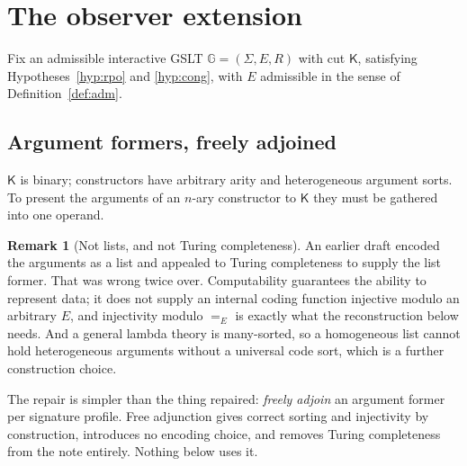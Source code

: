 \documentclass[11pt]{article}
\theoremstyle{plain}
\theoremstyle{definition}
\newtheorem{remark}[theorem]{Remark}
\newcommand{\Kc}{\mathsf{K}}
\newcommand{\Gg}{\mathbb{G}}
\begin{document}
\section{The observer extension}
\label{sec:construction}

Fix an admissible interactive GSLT $\Gg = (\Sigma,E,R)$ with cut $\Kc$, satisfying
Hypotheses~\ref{hyp:rpo} and \ref{hyp:cong}, with $E$ admissible in the sense of
Definition~\ref{def:adm}.

\subsection{Argument formers, freely adjoined}

$\Kc$ is binary; constructors have arbitrary arity and heterogeneous argument sorts. To present the
arguments of an $n$-ary constructor to $\Kc$ they must be gathered into one operand.

\begin{remark}[Not lists, and not Turing completeness]
\label{rem:noturing}
An earlier draft encoded the arguments as a list and appealed to Turing completeness to supply the list
former. That was wrong twice over. Computability guarantees the ability to represent data; it does not
supply an internal coding function injective modulo an arbitrary $E$, and injectivity modulo $=_E$ is
exactly what the reconstruction below needs. And a general lambda theory is many-sorted, so a
homogeneous list cannot hold heterogeneous arguments without a universal code sort, which is a further
construction choice.

The repair is simpler than the thing repaired: \emph{freely adjoin} an argument former per signature
profile. Free adjunction gives correct sorting and injectivity by construction, introduces no encoding
choice, and removes Turing completeness from the note entirely. Nothing below uses it.
\end{remark}
\end{document}
